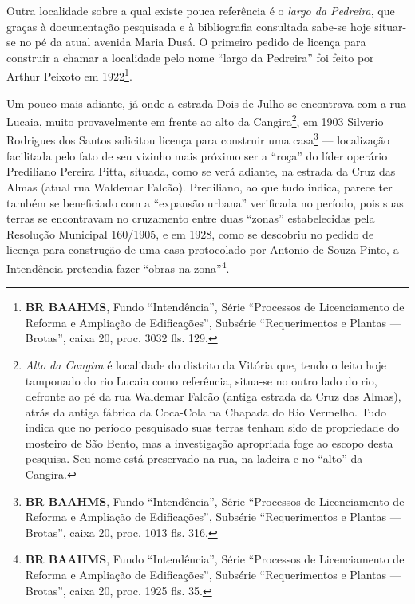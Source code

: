 Outra localidade sobre a qual existe pouca referência é o \textit{largo da Pedreira}, que graças à documentação pesquisada e à bibliografia consultada sabe-se hoje situar-se no pé da atual avenida Maria Dusá. O primeiro pedido de licença para construir a chamar a localidade pelo nome ``largo da Pedreira'' foi feito por Arthur Peixoto em 1922\footnote{\textbf{BR BAAHMS}, Fundo ``Intendência'', Série ``Processos de Licenciamento de Reforma e Ampliação de Edificações'', Subsérie ``Requerimentos e Plantas --- Brotas'', caixa 20, proc. 3032 fls. 129.}.

Um pouco mais adiante, já onde a estrada Dois de Julho se encontrava com a rua Lucaia, muito provavelmente em frente ao alto da Cangira\footnote{\textit{Alto da Cangira} é localidade do distrito da Vitória que, tendo o leito hoje tamponado do rio Lucaia como referência, situa-se no outro lado do rio, defronte ao pé da rua Waldemar Falcão (antiga estrada da Cruz das Almas), atrás da antiga fábrica da Coca-Cola na Chapada do Rio Vermelho. Tudo indica que no período pesquisado suas terras tenham sido de propriedade do mosteiro de São Bento, mas a investigação apropriada foge ao escopo desta pesquisa. Seu nome está preservado na rua, na ladeira e no ``alto'' da Cangira.}, em 1903 Silverio Rodrigues dos Santos solicitou licença para construir uma casa\footnote{\textbf{BR BAAHMS}, Fundo ``Intendência'', Série ``Processos de Licenciamento de Reforma e Ampliação de Edificações'', Subsérie ``Requerimentos e Plantas --- Brotas'', caixa 20, proc. 1013 fls. 316.} --- localização facilitada pelo fato de seu vizinho mais próximo ser a ``roça'' do líder operário Prediliano Pereira Pitta, situada, como se verá adiante, na estrada da Cruz das Almas (atual rua Waldemar Falcão). Prediliano, ao que tudo indica, parece ter também se beneficiado com a ``expansão urbana'' verificada no período, pois suas terras se encontravam no cruzamento entre duas ``zonas'' estabelecidas pela Resolução Municipal 160/1905, e em 1928, como se descobriu no pedido de licença para construção de uma casa protocolado por Antonio de Souza Pinto, a Intendência pretendia fazer ``obras na zona''\footnote{\textbf{BR BAAHMS}, Fundo ``Intendência'', Série ``Processos de Licenciamento de Reforma e Ampliação de Edificações'', Subsérie ``Requerimentos e Plantas --- Brotas'', caixa 20, proc. 1925 fls. 35.}.

